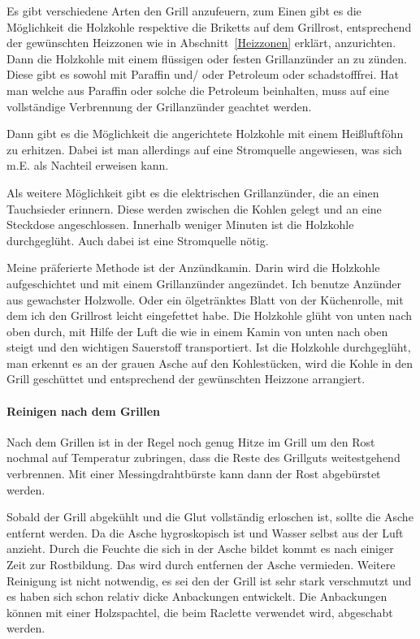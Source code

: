 	Es gibt verschiedene Arten den Grill anzufeuern, zum Einen gibt es die 
	Möglichkeit die Holzkohle respektive die Briketts auf 
	dem Grillrost,
	entsprechend der gewünschten Heizzonen wie in Abschnitt~\vref{Heizzonen} 
	erklärt, anzurichten. Dann die Holzkohle mit 
	einem flüssigen oder 
	festen Grillanzünder
	an zu zünden. Diese gibt es sowohl mit Paraffin und/ oder Petroleum oder 
	schadstofffrei. Hat man welche aus Paraffin oder 
	solche die Petroleum 
	beinhalten, muss auf eine 
	vollständige Verbrennung der Grillanzünder geachtet werden.
	
	Dann gibt es die Möglichkeit die angerichtete Holzkohle mit einem Heißluftföhn 
	zu erhitzen. Dabei ist man allerdings auf eine 
	Stromquelle 
	angewiesen, was sich m.E. als Nachteil
	erweisen kann.
	
	Als weitere Möglichkeit gibt es die elektrischen Grillanzünder, die an einen 
	Tauchsieder erinnern. Diese werden zwischen die 
	Kohlen gelegt und an 
	eine Steckdose angeschlossen. 
	Innerhalb weniger Minuten ist die Holzkohle durchgeglüht. Auch dabei ist eine 
	Stromquelle nötig.
	
	Meine präferierte Methode ist der Anzündkamin.  Darin wird die Holzkohle 
	aufgeschichtet und mit einem Grillanzünder 
	angezündet. Ich benutze 
	Anzünder aus gewachster Holzwolle. 
	Oder ein ölgetränktes Blatt von der Küchenrolle, mit dem ich den Grillrost leicht 
	eingefettet habe. Die Holzkohle glüht von unten nach oben 
	durch, mit Hilfe der 
	Luft die wie in einem Kamin von unten nach oben steigt
	und den wichtigen Sauerstoff transportiert. Ist die Holzkohle durchgeglüht, 
	man erkennt es an der grauen Asche auf den 
	Kohlestücken, wird die 
	Kohle in den Grill geschüttet und 
	entsprechend der gewünschten Heizzone arrangiert.

	\paragraph{Reinigen nach dem Grillen}

	Nach dem Grillen ist in der Regel noch genug Hitze im Grill um den Rost 
	nochmal auf Temperatur zubringen, dass die Reste 
	des Grillguts 
	weitestgehend verbrennen. 
	Mit einer Messingdrahtbürste kann dann der Rost abgebürstet werden.
	
	Sobald der Grill abgekühlt und die Glut vollständig erloschen ist, sollte die 
	Asche entfernt werden. Da die Asche 
	hygroskopisch ist und Wasser 
	selbst aus 
	der Luft anzieht. Durch die Feuchte die sich in der Asche bildet kommt es nach 
	einiger Zeit zur Rostbildung. Das wird durch 
	entfernen der Asche 
	vermieden.
	Weitere Reinigung ist nicht notwendig, es sei den der Grill ist sehr stark 
	verschmutzt und es haben sich schon relativ dicke 
	Anbackungen 
	entwickelt.
	Die Anbackungen können mit einer Holzspachtel, die beim Raclette verwendet 
	wird, abgeschabt werden.

